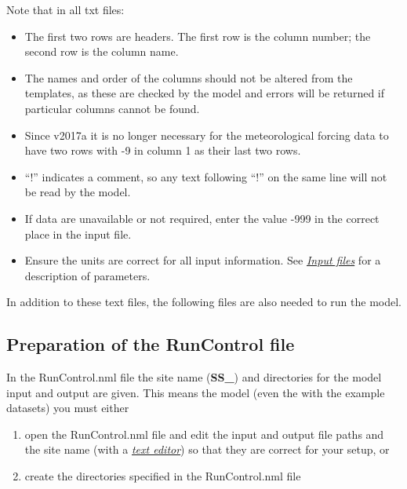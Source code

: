 \documentclass[letterpaper,10pt,english]{sphinxmanual}
\begin{document}
Note that in all txt files:
\begin{itemize}
\item {} 
The first two rows are headers. The first row is the column number;
the second row is the column name.

\item {} 
The names and order of the columns should not be altered from the
templates, as these are checked by the model and errors will be
returned if particular columns cannot be found.

\item {} 
Since v2017a it is no longer necessary for the meteorological forcing
data to have two rows with -9 in column 1 as their last two rows.

\item {} 
“!” indicates a comment, so any text following “!” on the same line
will not be read by the model.

\item {} 
If data are unavailable or not required, enter the value -999 in the
correct place in the input file.

\item {} 
Ensure the units are correct for all input information. See {\hyperref[\detokenize{prepare-to-run-the-model:Input_files}]{\emph{Input
files}}} for a description of parameters.

\end{itemize}

In addition to these text files, the following files are also needed to
run the model.


\subsection{Preparation of the RunControl file}
\label{\detokenize{prepare-to-run-the-model:preparation-of-the-runcontrol-file}}
In the RunControl.nml file the site name ({\color{red}\bfseries{}SS\_}) and directories for the
model input and output are given. This means  the
model (even the with the example datasets) you must either
\begin{enumerate}
\item {} 
open the RunControl.nml file and edit the input and output file paths
and the site name (with a {\hyperref[\detokenize{prepare-to-run-the-model:A_text_editor}]{\emph{text editor}}}) so that
they are correct for your setup, or

\item {} 
create the directories specified in the RunControl.nml file

\end{enumerate}
\end{document}
